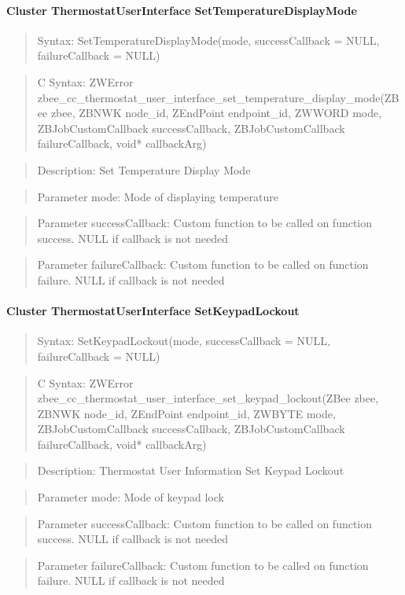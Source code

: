 \paragraph{Cluster ThermostatUserInterface SetTemperatureDisplayMode}
\begin{quote}Syntax: SetTemperatureDisplayMode(mode, successCallback = NULL, failureCallback = NULL)\end{quote}
\begin{quote}C Syntax: ZWError zbee\_cc\_thermostat\_user\_interface\_set\_temperature\_display\_mode(ZBee zbee, ZBNWK node\_id, ZEndPoint endpoint\_id, ZWWORD mode, ZBJobCustomCallback successCallback, ZBJobCustomCallback failureCallback, void* callbackArg)\end{quote}
\begin{quote}Description: Set Temperature Display Mode\end{quote}
\begin{quote}Parameter mode: Mode of displaying temperature\end{quote}
\begin{quote}Parameter successCallback: Custom function to be called on function success. NULL if callback is not needed\end{quote}
\begin{quote}Parameter failureCallback: Custom function to be called on function failure. NULL if callback is not needed\end{quote}


\paragraph{Cluster ThermostatUserInterface SetKeypadLockout}
\begin{quote}Syntax: SetKeypadLockout(mode, successCallback = NULL, failureCallback = NULL)\end{quote}
\begin{quote}C Syntax: ZWError zbee\_cc\_thermostat\_user\_interface\_set\_keypad\_lockout(ZBee zbee, ZBNWK node\_id, ZEndPoint endpoint\_id, ZWBYTE mode, ZBJobCustomCallback successCallback, ZBJobCustomCallback failureCallback, void* callbackArg)\end{quote}
\begin{quote}Description: Thermostat User Information Set Keypad Lockout\end{quote}
\begin{quote}Parameter mode: Mode of keypad lock\end{quote}
\begin{quote}Parameter successCallback: Custom function to be called on function success. NULL if callback is not needed\end{quote}
\begin{quote}Parameter failureCallback: Custom function to be called on function failure. NULL if callback is not needed\end{quote}


